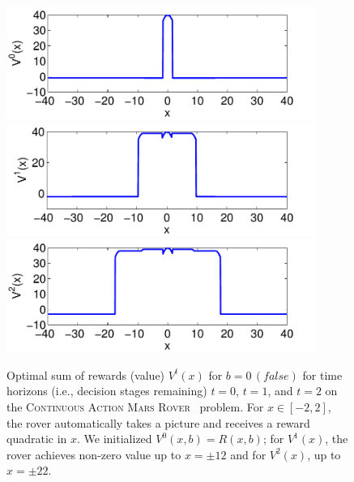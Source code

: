 \documentclass[twoside,11pt]{article}
\newcommand{\MarsRover}{\textsc{Mars Rover }}
\newcommand{\false}{\mathit{false}}
\begin{document}
\begin{figure}[t!]
\begin{minipage}[b]{0.48\linewidth}
\includegraphics[width=0.9\textwidth]{Figures2/diagrams/v1_2d.pdf}\\
\includegraphics[width=0.9\textwidth]{Figures2/diagrams/v2_2d.pdf}\\
\includegraphics[width=0.9\textwidth]{Figures2/diagrams/v3_2d.pdf}

\caption{\footnotesize Optimal sum of rewards (value) 
$V^t(x)$ for $b = 0 \, 
(\false)$ for time horizons (i.e., decision stages remaining) $t=0$,
$t=1$, and $t=2$ on the \textsc{Continuous Action}  \MarsRover\ problem.  For $x \in [-2,2]$, the
rover automatically takes a picture and receives a reward quadratic in
$x$.  We initialized $V^0(x,b) = R(x,b)$; for $V^1(x)$, the rover achieves
non-zero value up to $x = \pm 12$ and for 
$V^2(x)$, up to $x = \pm 22$.}
\label{fig:opt_graph}


\end{minipage}
\end{figure}
\end{document}
